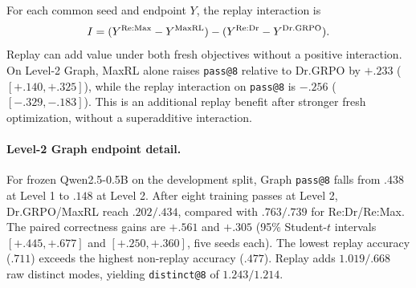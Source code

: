 \documentclass{article}
\newcommand{\1}{\mathbf 1}
\newcommand{\pmd}{\texttt{PCMD}}
\theoremstyle{remark}
\theoremstyle{definition}
\theoremstyle{plain}
\begin{document}
For each common seed and endpoint $Y$, the replay interaction is
\[
 I=(Y^{\rm Re:Max}-Y^{\rm MaxRL})
    -(Y^{\rm Re:Dr}-Y^{\rm Dr.GRPO}).
\]
Replay can add value under both fresh objectives without a positive
interaction. On Level-2 Graph, MaxRL alone raises \texttt{pass@8} relative to Dr.GRPO
by $+.233$ ($[+.140,+.325]$), while the replay interaction on \texttt{pass@8} is
$-.256$ ($[-.329,-.183]$). This is an additional replay benefit after
stronger fresh optimization, without a superadditive interaction.

\begin{table}[!htbp]
  \centering
  \caption{\textbf{A stronger fresh objective need not increase replay's additional benefit.}
  Five common seeds per domain for all four methods. The interaction is
  $(\mathrm{Re:Max}-\mathrm{MaxRL})-(\mathrm{Re:Dr}-\mathrm{Dr.GRPO})$.
  Here $P_8=\texttt{pass@8}$, $D_8=\texttt{distinct@8}$, and $B_8=D_8-P_8$.
  Entries give paired means and nominal 95\% Student-$t$ intervals.
  Both count metrics remain coupled to correctness. Four-arm \pmd{}
  comparisons have five eligible seeds in Python, four in MathIR, three in
  Graph, two in PantryPlan, and none in Countdown, so they do not share this
  table's five-seed population.}

\label{tab:level2-factorial-contrasts}
  \scriptsize
  \setlength{\tabcolsep}{3pt}
\end{table}


\paragraph{Level-2 Graph endpoint detail.}
\label{app:levels-numerical-detail}
For frozen Qwen2.5-0.5B on the development split, Graph \texttt{pass@8}
falls from $.438$ at Level 1 to $.148$ at Level 2. After eight training
passes at Level 2, Dr.GRPO/MaxRL reach $.202/.434$, compared with $.763/.739$
for Re:Dr/Re:Max. The paired correctness gains are $+.561$ and $+.305$
(95\% Student-$t$ intervals $[+.445,+.677]$ and $[+.250,+.360]$, five seeds
each). The lowest replay accuracy ($.711$) exceeds the highest non-replay
accuracy ($.477$). Replay adds $1.019/.668$ raw distinct modes, yielding
\texttt{distinct@8} of $1.243/1.214$.
\end{document}
